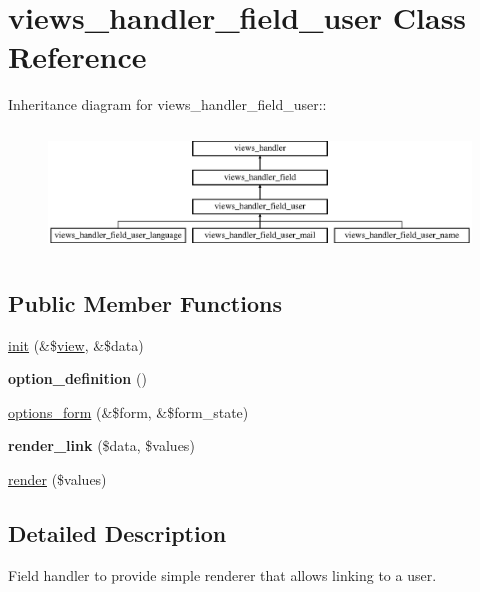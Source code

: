 \hypertarget{classviews__handler__field__user}{
\section{views\_\-handler\_\-field\_\-user Class Reference}
\label{classviews__handler__field__user}
}
Inheritance diagram for views\_\-handler\_\-field\_\-user::\begin{figure}[H]
\begin{center}
\leavevmode
\includegraphics[height=3.33333cm]{classviews__handler__field__user}
\end{center}
\end{figure}
\subsection*{Public Member Functions}
\begin{DoxyCompactItemize}
\item 
\hyperlink{classviews__handler__field__user_a94156733dfddeb57dbd856e0f574cde6}{init} (\&\$\hyperlink{classview}{view}, \&\$data)
\item 
\hypertarget{classviews__handler__field__user_a545d229a041bf920b95ac59d89b1e4b2}{
{\bfseries option\_\-definition} ()}
\label{classviews__handler__field__user_a545d229a041bf920b95ac59d89b1e4b2}

\item 
\hyperlink{classviews__handler__field__user_aecf77682fa7dc9daf1fa97cbe045420d}{options\_\-form} (\&\$form, \&\$form\_\-state)
\item 
\hypertarget{classviews__handler__field__user_ad3ed8d04736b14db03cba8b98757b3ff}{
{\bfseries render\_\-link} (\$data, \$values)}
\label{classviews__handler__field__user_ad3ed8d04736b14db03cba8b98757b3ff}

\item 
\hyperlink{classviews__handler__field__user_a145dcce889ee17821a1d9c65970d86f2}{render} (\$values)
\end{DoxyCompactItemize}


\subsection{Detailed Description}
Field handler to provide simple renderer that allows linking to a user. 

